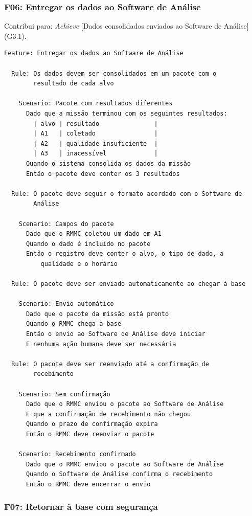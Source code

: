 \documentclass[a4paper, 12pt]{article}
\begin{document}
\Needspace{8cm}
\subsubsection{F06: Entregar os dados ao Software de Análise}

Contribui para: \textit{Achieve} [Dados consolidados enviados ao Software de Análise] (G3.1).

{\small
\begin{verbatim}
Feature: Entregar os dados ao Software de Análise

  Rule: Os dados devem ser consolidados em um pacote com o
        resultado de cada alvo

    Scenario: Pacote com resultados diferentes
      Dado que a missão terminou com os seguintes resultados:
        | alvo | resultado               |
        | A1   | coletado                |
        | A2   | qualidade insuficiente  |
        | A3   | inacessível             |
      Quando o sistema consolida os dados da missão
      Então o pacote deve conter os 3 resultados

  Rule: O pacote deve seguir o formato acordado com o Software de
        Análise

    Scenario: Campos do pacote
      Dado que o RMMC coletou um dado em A1
      Quando o dado é incluído no pacote
      Então o registro deve conter o alvo, o tipo de dado, a
          qualidade e o horário

  Rule: O pacote deve ser enviado automaticamente ao chegar à base

    Scenario: Envio automático
      Dado que o pacote da missão está pronto
      Quando o RMMC chega à base
      Então o envio ao Software de Análise deve iniciar
      E nenhuma ação humana deve ser necessária

  Rule: O pacote deve ser reenviado até a confirmação de
        recebimento

    Scenario: Sem confirmação
      Dado que o RMMC enviou o pacote ao Software de Análise
      E que a confirmação de recebimento não chegou
      Quando o prazo de confirmação expira
      Então o RMMC deve reenviar o pacote

    Scenario: Recebimento confirmado
      Dado que o RMMC enviou o pacote ao Software de Análise
      Quando o Software de Análise confirma o recebimento
      Então o RMMC deve encerrar o envio
\end{verbatim}
}

\Needspace{8cm}
\subsubsection{F07: Retornar à base com segurança}
\end{document}
